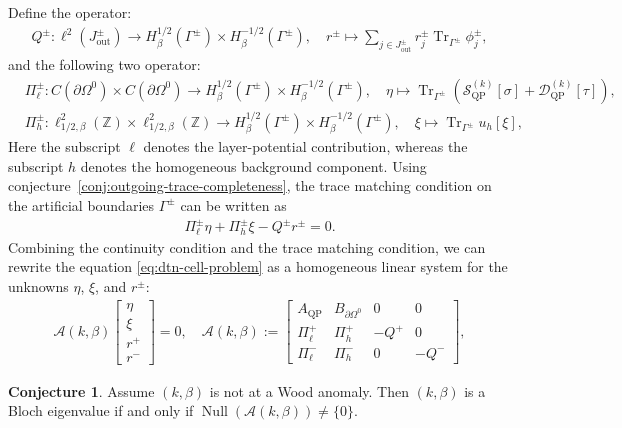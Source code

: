 \documentclass[11pt,fleqn]{article}
\theoremstyle{definition}
\newtheorem{conjecture}{Conjecture}
\theoremstyle{remark}
\begin{document}
Define the operator: \begin{align}
  Q^\pm: \ell^2(J_\mathrm{out}^\pm) \to H^{1/2}_\beta(\Gamma^\pm)\times H^{-1/2}_\beta(\Gamma^\pm),\quad r^\pm \mapsto \sum_{j\in J^\pm_\mathrm{out}} r_j^\pm \operatorname{Tr}_{\Gamma^\pm}\phi_j^\pm,
\end{align}
and the following two operator:\begin{align}
  &\Pi_\ell^\pm: C(\partial \Omega^0) \times C(\partial \Omega^0) \to H^{1/2}_\beta(\Gamma^\pm)\times H^{-1/2}_\beta(\Gamma^\pm), \quad \eta \mapsto \operatorname{Tr}_{\Gamma^\pm} \left(\mathcal{S}^{(k)}_{\mathrm{QP}}[\sigma] + \mathcal{D}^{(k)}_{\mathrm{QP}}[\tau]\right),\\
  &\Pi_h^\pm: \ell^2_{1/2,\beta}(\mathbb{Z}) \times \ell^2_{1/2,\beta}(\mathbb{Z}) \to H^{1/2}_\beta(\Gamma^\pm)\times H^{-1/2}_\beta(\Gamma^\pm), \quad \xi \mapsto \operatorname{Tr}_{\Gamma^\pm} u_h[\xi],
\end{align}
Here the subscript $\ell$ denotes the layer-potential contribution,
whereas the subscript $h$ denotes the homogeneous background
component. Using conjecture~\ref{conj:outgoing-trace-completeness}, the trace matching condition on the artificial boundaries $\Gamma^\pm$ can be written as \begin{align}
  \Pi_\ell^\pm \eta + \Pi_h^\pm \xi - Q^\pm r^\pm = 0.
\end{align}
Combining the continuity condition and the trace matching condition, we can rewrite the
equation \eqref{eq:dtn-cell-problem} as a homogeneous linear system for the unknowns
\(\eta\), \(\xi\), and \(r^\pm\):
\begin{align}
  \mathcal{A}(k,\beta)\begin{bmatrix}
    \eta \\ \xi \\ r^+ \\ r^-
  \end{bmatrix} = 0, \quad
  \mathcal{A}(k,\beta) := \begin{bmatrix}
    A_{\mathrm{QP}} & B_{\partial \Omega^0} & 0 & 0\\
    \Pi_\ell^+ & \Pi_h^+ & -Q^+ & 0\\
    \Pi_\ell^- & \Pi_h^- & 0 & -Q^-
  \end{bmatrix},
\end{align}
\begin{conjecture}
  Assume $(k,\beta)$ is not at a Wood anomaly.
  Then \((k,\beta)\) is a Bloch eigenvalue 
  if and only if $\operatorname{Null}(\mathcal{A}(k,\beta)) \neq \{0\}$.
\end{conjecture}
\end{document}
